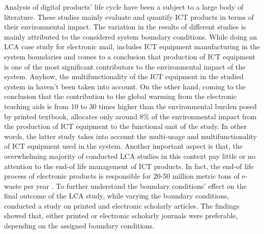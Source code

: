 \documentclass[conference]{IEEEtran}
\begin{document}
Analysis of digital products' life cycle have been a subject to a large body of literature. These studies mainly evaluate and quantify ICT products in terms of their environmental impact. The variation in the results of different studies is mainly attributed to the considered system boundary conditions. While doing an LCA case study for electronic mail, \cite{farrant2012environmental} includes ICT equipment manufacturing in the system boundaries and comes to a conclusion that production of ICT equipment is one of the most significant contributors to the environmental impact of the system. Anyhow, the multifunctionality of the ICT equipment in the studied system in \cite{farrant2012environmental} haven't been taken into account. On the other hand, coming to the conclusion that the contribution to the global warming from the electronic teaching aids is from 10 to 30 times higher than the environmental burden posed by printed textbook, \cite{enroth2009} allocates only around 8\% of the environmental impact from the production of ICT equipment to the functional unit of the study. In other words, the latter study takes into account the multi-usage and multifunctionality of ICT equipment used in the system.
Another important aspect is that, the overwhelming majority of conducted LCA studies in this context pay little or no attention to the end-of life management of ICT products. In fact, the end-of life process of electronic products is responsible for 20-50 million metric tons of e-waste per year \cite{koljonen2008environmental}. To further understand the boundary conditions' effect on the final outcome of the LCA study, \cite{gard2002digital} while varying the boundary conditions, conducted a study on printed and electronic scholarly articles. The findings showed that, either printed or electronic scholarly journals were preferable, depending on the assigned boundary conditions.
\end{document}
